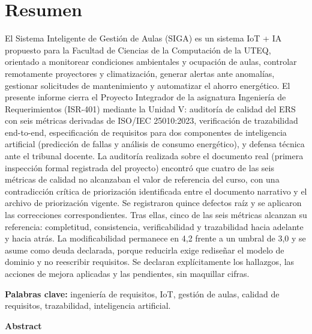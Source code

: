 \section*{Resumen}

El Sistema Inteligente de Gesti\'on de Aulas (SIGA) es un sistema IoT + IA propuesto para la Facultad de Ciencias de la Computaci\'on de la UTEQ, orientado a monitorear condiciones ambientales y ocupaci\'on de aulas, controlar remotamente proyectores y climatizaci\'on, generar alertas ante anomal\'ias, gestionar solicitudes de mantenimiento y automatizar el ahorro energ\'etico. El presente informe cierra el Proyecto Integrador de la asignatura Ingenier\'ia de Requerimientos (ISR-401) mediante la Unidad V: auditor\'ia de calidad del ERS con seis m\'etricas derivadas de ISO/IEC 25010:2023, verificaci\'on de trazabilidad end-to-end, especificaci\'on de requisitos para dos componentes de inteligencia artificial (predicci\'on de fallas y an\'alisis de consumo energ\'etico), y defensa t\'ecnica ante el tribunal docente. La auditor\'ia realizada sobre el documento real (primera inspecci\'on formal registrada del proyecto) encontr\'o que cuatro de las seis m\'etricas de calidad no alcanzaban el valor de referencia del curso, con una contradicci\'on cr\'itica de priorizaci\'on identificada entre el documento narrativo y el archivo de priorizaci\'on vigente. Se registraron quince defectos ra\'iz y se aplicaron las correcciones correspondientes. Tras ellas, cinco de las seis m\'etricas alcanzan su referencia: completitud, consistencia, verificabilidad y trazabilidad hacia adelante y hacia atr\'as. La modificabilidad permanece en 4,2 frente a un umbral de 3,0 y se asume como deuda declarada, porque reducirla exige rediseñar el modelo de dominio y no reescribir requisitos. Se declaran expl\'icitamente los hallazgos, las acciones de mejora aplicadas y las pendientes, sin maquillar cifras.

\textbf{Palabras clave:} ingenier\'ia de requisitos, IoT, gesti\'on de aulas, calidad de requisitos, trazabilidad, inteligencia artificial.

\bigskip
\textbf{Abstract}

